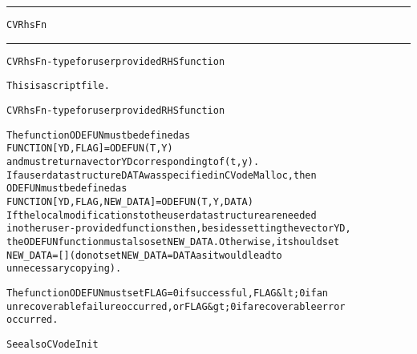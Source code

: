 \begin{samepage}
\hrule
\begin{center}
{\large \verb!CVRhsFn!}
\label{p:CVRhsFn}
\end{center}
\hrule\vspace{0.1in}



\begin{alltt}
CVRhsFn - type for user provided RHS function
\end{alltt}

\end{samepage}



\begin{samepage}


\begin{alltt}
This is a script file. 
\end{alltt}

\end{samepage}



\begin{alltt}
CVRhsFn - type for user provided RHS function

   The function ODEFUN must be defined as 
        FUNCTION [YD, FLAG] = ODEFUN(T,Y)
   and must return a vector YD corresponding to f(t,y).
   If a user data structure DATA was specified in CVodeMalloc, then
   ODEFUN must be defined as
        FUNCTION [YD, FLAG, NEW_DATA] = ODEFUN(T,Y,DATA)
   If the local modifications to the user data structure are needed 
   in other user-provided functions then, besides setting the vector YD,
   the ODEFUN function must also set NEW_DATA. Otherwise, it should set
   NEW_DATA=[] (do not set NEW_DATA = DATA as it would lead to
   unnecessary copying).

   The function ODEFUN must set FLAG=0 if successful, FLAG&lt;0 if an
   unrecoverable failure occurred, or FLAG&gt;0 if a recoverable error
   occurred.

   See also CVodeInit
\end{alltt}






\vspace{0.1in}